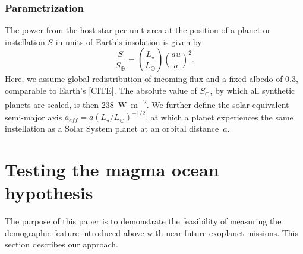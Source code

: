 \documentclass[modern]{aastex631}
\begin{document}
\subsubsection{Parametrization}
\label{sec:mo_model}



\begin{note}
    The power from the host star per unit area at the position of a planet or instellation $S$ in units of Earth's insolation is given by
    \begin{equation}
        \frac{S}{S_\oplus} = \left(\frac{L_\star}{L_\odot}\right) \left(\frac{au}{a}\right)^2 .
    \end{equation}
    Here, we assume global redistribution of incoming flux and a fixed albedo of $0.3$, comparable to Earth's [CITE].
    The absolute value of $S_\oplus$, by which all synthetic planets are scaled, is then \SI{238}{\watt\per\square\meter}.
    We further define the solar-equivalent semi-major axis $a_{eff} = a (L_\star/L_\odot)^{-1/2}$, at which a planet experiences the same instellation as a Solar System planet at an orbital distance~$a$.
\end{note}





\section{Testing the magma ocean hypothesis}
The purpose of this paper is to demonstrate the feasibility of measuring the demographic feature introduced above with near-future exoplanet missions.
This section describes our approach.
\end{document}
